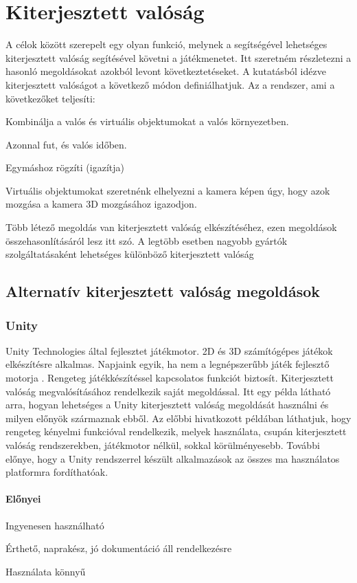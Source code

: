 \documentclass[12pt,a4paper,oneside]{report} %
\begin{document}
\section{Kiterjesztett valóság}
\label{kitvalo}
A célok között szerepelt egy olyan funkció, melynek a segítségével lehetséges kiterjesztett valóság segítésével követni a játékmenetet. Itt szeretném részletezni a hasonló megoldásokat azokból levont következtetéseket.
A \cite{azuma2001recent} kutatásból idézve  kiterjesztett valóságot a következő módon definiálhatjuk. Az a rendszer, ami a következőket teljesíti:
\begin{compactitem}
	\item Kombinálja a valós és virtuális objektumokat a valós környezetben.
	\item Azonnal fut, és valós időben.
	\item Egymáshoz rögzíti (igazítja) %
\end{compactitem}
Virtuális objektumokat szeretnénk elhelyezni a kamera képen úgy, hogy azok mozgása a kamera 3D mozgásához igazodjon. 
\par Több létező megoldás van kiterjesztett valóság elkészítéséhez, ezen megoldások összehasonlításáról lesz itt szó.
A legtöbb esetben nagyobb gyártók szolgáltatásaként lehetséges különböző kiterjesztett valóság
\subsection{Alternatív kiterjesztett valóság megoldások}
\subsubsection{Unity}
Unity Technologies által fejlesztet játékmotor. 2D és 3D számítógépes játékok elkészítésre alkalmas. Napjaink egyik, ha nem a legnépszerűbb játék fejlesztő motorja \cite{haas2014history}.
Rengeteg játékkészítéssel kapcsolatos funkciót biztosít. Kiterjesztett valóság megvalósításához rendelkezik saját megoldással. Itt \cite{kim2014using} egy példa látható arra, hogyan lehetséges a Unity kiterjesztett valóság megoldását használni és milyen előnyök származnak ebből. Az előbbi hivatkozott példában láthatjuk, hogy rengeteg kényelmi funkcióval rendelkezik, melyek használata, csupán kiterjesztett valóság rendszerekben, játékmotor nélkül, sokkal körülményesebb.  További előnye, hogy a Unity rendszerrel készült alkalmazások az összes ma használatos platformra fordíthatóak. 
\paragraph{Előnyei} 
\begin{compactitem}
	\item Ingyenesen használható
	\item Érthető, naprakész, jó dokumentáció áll rendelkezésre
	\item Használata könnyű
\end{compactitem}
\end{document}
